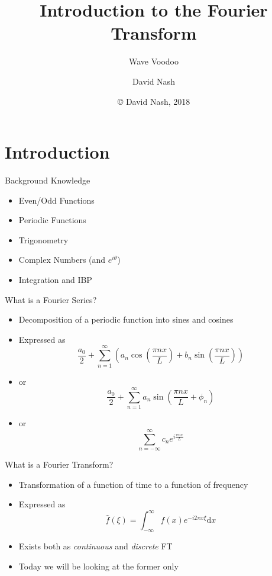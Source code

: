 

\title{Introduction to the Fourier Transform}
\subtitle{Wave Voodoo}
\author{David Nash}
\date{\copyright{} David Nash, 2018}


	\frame{\titlepage}
	\section{Introduction}
	\begin{namedframe}{Background Knowledge}
		\begin{itemize}
			\item {Even/Odd Functions}
			\item {Periodic Functions}
			\item {Trigonometry}
			\item {Complex Numbers (and $e^{i\theta}$)}
			\item {Integration and IBP}
		\end{itemize}
	\end{namedframe}
	\begin{namedframe}{What is a Fourier Series?}
		\begin{itemize}
			\item {Decomposition of a periodic function into sines and cosines}
			\item {Expressed as $$\frac{a_0}{2}+\sum_{n=1}^{\infty}\left(a_n\cos\left(\frac{\pi nx}{L}\right) + b_n\sin\left(\frac{\pi nx}{L}\right)\right)$$}
			\item {or $$\frac{a_0}{2} + \sum_{n=1}^{\infty}a_n\sin\left(\frac{\pi nx}{L}+\phi_n\right)$$}
			\item {or $$\sum_{n=-\infty}^{\infty}c_ne^{i\frac{\pi nx}{L}}$$}
		\end{itemize}
	\end{namedframe}
	\begin{namedframe}{What is a Fourier Transform?}
		\begin{itemize}
			\item{Transformation of a function of time to a function of frequency}
			\item{Expressed as $$\hat{f}(\xi) = \int_{-\infty}^{\infty}f(x)e^{-i2\pi x\xi}\mathrm{d}x$$}
			\item{Exists both as \textit{continuous} and \textit{discrete} FT}
			\item{Today we will be looking at the former only}
		\end{itemize}
	\end{namedframe}
